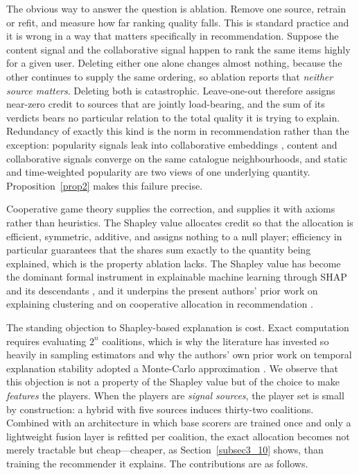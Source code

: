 \documentclass[pdflatex,sn-mathphys-num]{sn-jnl}%
\theoremstyle{thmstyleone}%
\theoremstyle{thmstyletwo}%
\theoremstyle{thmstylethree}%
\begin{document}
The obvious way to answer the question is ablation. Remove one source, retrain or refit, and measure how far ranking quality falls. This is standard practice and it is wrong in a way that matters specifically in recommendation. Suppose the content signal and the collaborative signal happen to rank the same items highly for a given user. Deleting either one alone changes almost nothing, because the other continues to supply the same ordering, so ablation reports that \emph{neither source matters}. Deleting both is catastrophic. Leave-one-out therefore assigns near-zero credit to sources that are jointly load-bearing, and the sum of its verdicts bears no particular relation to the total quality it is trying to explain. Redundancy of exactly this kind is the norm in recommendation rather than the exception: popularity signals leak into collaborative embeddings \cite{abdollahpouri2019,cremonesi2010}, content and collaborative signals converge on the same catalogue neighbourhoods, and static and time-weighted popularity are two views of one underlying quantity. Proposition~\ref{prop2} makes this failure precise.

Cooperative game theory supplies the correction, and supplies it with axioms rather than heuristics. The Shapley value \cite{shapley1953} allocates credit so that the allocation is efficient, symmetric, additive, and assigns nothing to a null player; efficiency in particular guarantees that the shares sum exactly to the quantity being explained, which is the property ablation lacks. The Shapley value has become the dominant formal instrument in explainable machine learning through SHAP and its descendants \cite{lundberg2017,lundberg2020,covert2021,li2024shapley}, and it underpins the present authors' prior work on explaining clustering \cite{louhichi2023,louhichi2025} and on cooperative allocation in recommendation \cite{louhichi2026,nesmaoui2025}.

The standing objection to Shapley-based explanation is cost. Exact computation requires evaluating $2^{n}$ coalitions, which is why the literature has invested so heavily in sampling estimators \cite{castro2009,strumbelj2010} and why the authors' own prior work on temporal explanation stability adopted a Monte-Carlo approximation \cite{nesmaoui2026drift}. We observe that this objection is not a property of the Shapley value but of the choice to make \emph{features} the players. When the players are \emph{signal sources}, the player set is small by construction: a hybrid with five sources induces thirty-two coalitions. Combined with an architecture in which base scorers are trained once and only a lightweight fusion layer is refitted per coalition, the exact allocation becomes not merely tractable but cheap---cheaper, as Section~\ref{subsec3_10} shows, than training the recommender it explains. The contributions are as follows.
\end{document}
